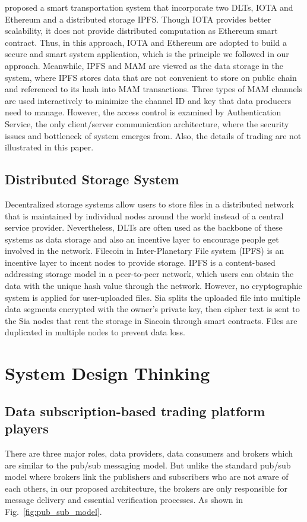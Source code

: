 \documentclass[conference]{IEEEtran}
\begin{document}
\cite{SocialGood} proposed a smart transportation system that incorporate two DLTs, IOTA and Ethereum and a distributed storage IPFS. Though IOTA provides better scalability, it does not provide distributed computation as Ethereum smart contract. Thus, in this approach, IOTA and Ethereum are adopted to build a secure and smart system application, which is the principle we followed in our approach. Meanwhile, IPFS and MAM are viewed as the data storage in the system, where IPFS stores data that are not convenient to store on public chain and referenced to its hash into MAM transactions. Three types of MAM channels are used interactively to minimize the channel ID and key that data producers need to manage. However, the access control is examined by Authentication Service, the only client/server communication architecture, where the security issues and bottleneck of system emerges from. Also, the details of trading are not illustrated in this paper.
  
\subsection{Distributed Storage System}
Decentralized storage systems allow users to store files in a distributed network that is maintained by individual nodes around the world instead of a central service provider. Nevertheless, DLTs are often used as the backbone of these systems as data storage and also an incentive layer to encourage people get involved in the network. Filecoin \cite{FileCoin} in Inter-Planetary File system (IPFS) is an incentive layer to incent nodes to provide storage. IPFS is a content-based addressing storage model in a peer-to-peer network, which users can obtain the data with the unique hash value through the network. However, no cryptographic system is applied for user-uploaded files. Sia\cite{Sia} splits the uploaded file into multiple data segments encrypted with the owner's private key, then cipher text is sent to the Sia nodes that rent the storage in Siacoin through smart contracts. Files are duplicated in multiple nodes to prevent data loss.

\section{System Design Thinking}
\subsection{Data subscription-based trading platform players}
There are three major roles, data providers, data consumers and brokers which are similar to the pub/sub messaging model. But unlike the standard pub/sub model where brokers link the publishers and subscribers who are not aware of each others, in our proposed architecture, the brokers are only responsible for message delivery and essential verification processes. As shown in Fig.~\ref{fig:pub_sub_model}.
\end{document}
